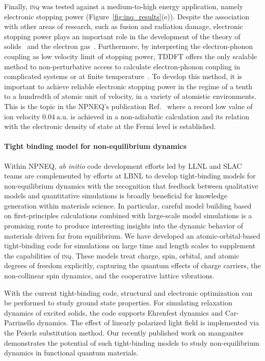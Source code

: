 Finally, \textsc{inq} was tested against a medium-to-high energy application, namely electronic stopping power (Figure~\ref{fig:inq_results}(e)). 
Despite the association with other areas of research, such as fusion and radiation damage, electronic stopping power plays an important role in the development of the theory of solids~\cite{Thomson1912, Darwin1912, Bohr1913} and the electron gas~\cite{Lindhard1964}.
Furthermore, by interpreting the electron-phonon coupling as low velocity limit of stopping power, TDDFT offers the only scalable method to non-perturbative access to calculate electron-phonon coupling in complicated systems or at finite temperature~\cite{Caro2015}. 
To develop this method, it is important to achieve reliable electronic stopping power in the regime of a tenth to a hundredth of atomic unit of velocity, in a variety of atomistic environments. 
This is the topic in the NPNEQ's publication Ref.~\cite{Quashie2020} where a record low value of ion velocity \(0.04~\mathrm{a.u.}\) is achieved in a non-adiabatic calculation and its relation with the electronic density of state at the Fermi level is established.

\paragraph{Tight binding model for non-equilibrium dynamics}\label{sec:tight-binding}

Within NPNEQ, \emph{ab initio} code development efforts led by LLNL and SLAC teams are complemented by efforts at LBNL to develop tight-binding models for non-equilibrium dynamics with the recognition that feedback between qualitative models and quantitative simulations is broadly beneficial for knowledge generation within materials science. 
In particular, careful model building based on first-principles calculations combined with large-scale model simulations is a promising route to produce interesting insights into the dynamic behavior of  materials driven far from equilibrium. 
We have developed an atomic-orbital-based tight-binding code for simulations on large time and length scales to supplement the capabilities of \textsc{inq}. 
These models treat charge, spin, orbital, and atomic degrees of freedom explicitly, capturing the quantum effects of charge carriers, the non-collinear spin dynamics, and the cooperative lattice vibrations. 

With the current tight-binding code, structural and electronic optimization can be performed to study ground state properties. 
For simulating relaxation dynamics of excited solids, the code supports Ehrenfest dynamics and Car-Parrinello dynamics. 
The effect of linearly polarized light field is implemented via the Peierls substitution method. 
Our recently published work on manganites~\cite{Rajpurohit2021} demonstrates the potential of such tight-binding models to study non-equilibrium dynamics in functional quantum materials. 

